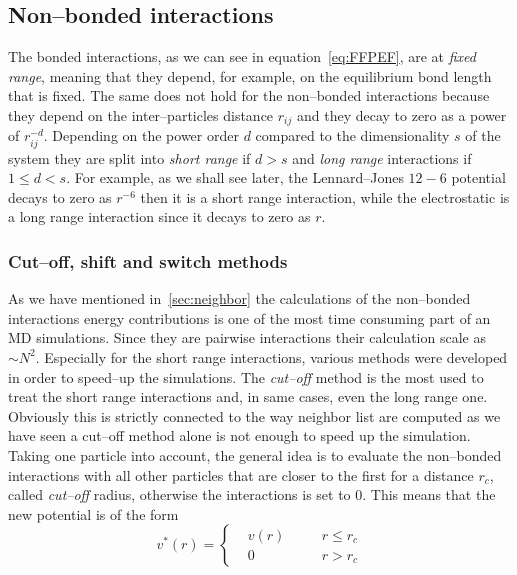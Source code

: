 \subsection{Non--bonded interactions}
\label{sec:nonbonded}
The bonded interactions, as we can see in equation~\eqref{eq:FFPEF}, are at \textit{fixed range}, meaning that they depend, for example, on the equilibrium bond length that is fixed. The same does not hold for the non--bonded interactions because they depend on the inter--particles distance $r_{ij}$ and they decay to zero as a power of $r_{ij}^{-d}$. Depending on the power order $d$ compared to the dimensionality $s$ of the system they are split into \textit{short range} if $d>s$ and \textit{long range} interactions if $1 \le d < s$. For example, as we shall see later, the Lennard--Jones $12-6$ potential decays to zero as $r^{-6}$ then it is a short range interaction, while the electrostatic is a long range interaction since it decays to zero as $r$.

\subsubsection{Cut--off, shift and switch methods}
As we have mentioned in~\ref{sec:neighbor} the calculations of the non--bonded interactions energy contributions is one of the most time consuming part of an \ac{MD} simulations. Since they are pairwise interactions their calculation scale as $\sim N^2$. Especially for the short range interactions, various methods were developed in order to speed--up the simulations. The \textit{cut--off} method is the most used to treat the short range interactions and, in same cases, even the long range one. Obviously this is strictly connected to the way neighbor list are computed as we have seen a cut--off method alone is not enough to speed up the simulation. Taking one particle into account, the general idea is to evaluate the non--bonded interactions with all other particles that are closer to the first for a distance $r_c$, called \textit{cut--off} radius, otherwise the interactions is set to $0$. This means that the new potential is of the form
\begin{equation*}
v^*(r) = \left \{
	\begin{aligned}
&v(r) & \quad & r \le r_c \\
&0    & \quad & r >   r_c
	\end{aligned} \right .
\end{equation*}

